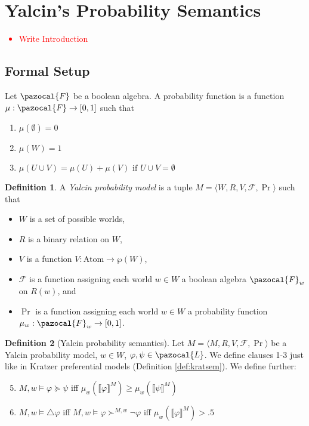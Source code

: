 \documentclass{article}
\theoremstyle{definition}
\newtheorem{definition}{Definition}
\newcommand\todo[1]{\textcolor{red}{#1}}
\renewcommand{\L}{\pazocal{L}}
\newcommand{\F}{\pazocal{F}}
\newcommand{\lb}{\llbracket}
\newcommand{\rb}{\rrbracket}
\begin{document}
\section{Yalcin's Probability Semantics}

\todo{
  \begin{itemize}
    \item Write Introduction
  \end{itemize}
}
\subsection{Formal Setup}

\noindent Let $\F$ be a boolean algebra. A probability function is a function $\mu: \F \rightarrow [0,1]$ such that
\begin{enumerate}[nosep]
  \item $\mu(\emptyset) = 0$ 
  \item $\mu(W) = 1$
  \item $\mu(U \cup V) = \mu(U) + \mu(V) \text{ if } U \cup V = \emptyset $
\end{enumerate}

\begin{definition}
    A \emph{Yalcin probability model} is a tuple $M = \langle W,R,V,\mathcal{F},\Pr\rangle$ such that
    \begin{itemize}[nosep]
        \renewcommand\labelitemi{--}
      \item $W$ is a set of possible worlds,
      \item $R$ is a binary relation on $W$,
        \item $V$ is a function $V: \text{Atom} \rightarrow \wp(W)$,
        \item $\mathcal{F}$ is a function assigning each world $w \in W$ a boolean algebra $\F_w$ on $R(w)$, and 
          \item $\Pr$ is a function assigning each world $w \in W$ a probability function \\ $\mu_w: \F_w \rightarrow [0,1]$.
    \end{itemize}
\end{definition}

\begin{definition}[Yalcin probability semantics]
    \label{def:yalcsem}
    Let $M = \langle M,R,V,\mathcal{F},\Pr \rangle$ be a Yalcin probability model, $w \in W$, $\varphi, \psi \in \L$. We define clauses 1-3 just like in Kratzer preferential models (Definition \ref{def:kratsem}). We define further:
    \begin{enumerate}[nosep]
  \setcounter{enumi}{4}
      \item $M,w \models \varphi \succeq \psi$ iff $\mu_w(\lb \varphi \rb^M) \geq \mu_w(\lb \psi \rb^M) $
      \item $M,w \models \triangle \varphi$ iff $M,w \models \varphi \succ^{M,w} \neg \varphi$ iff $ \mu_w(\lb \varphi \rb^M) > .5$
    \end{enumerate}
\end{definition}
\end{document}
